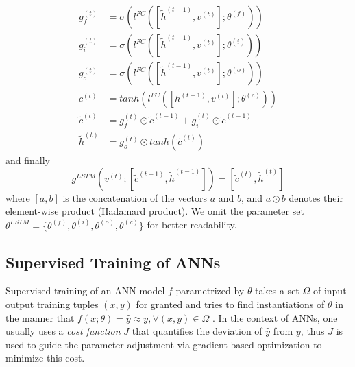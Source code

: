 \begin{equation} \label{eq:lstm_interm}
\begin{split}
g_f^{(t)} & = \sigma(l^{FC}([\tilde{h}^{(t-1)}, v^{(t)}]; \theta^{(f)})) \\
g_i^{(t)} & = \sigma(l^{FC}([\tilde{h}^{(t-1)}, v^{(t)}]; \theta^{(i)})) \\
g_o^{(t)} & = \sigma(l^{FC}([\tilde{h}^{(t-1)}, v^{(t)}]; \theta^{(o)})) \\
c^{(t)} & = tanh(l^{FC}([h^{(t-1)}, v^{(t)}]; \theta^{(c)})) \\
\tilde{c}^{(t)} & = g_f^{(t)} \odot \tilde{c}^{(t-1)} + g_i^{(t)} \odot \tilde{c}^{(t-1)} \\
\tilde{h}^{(t)} & = g_o^{(t)} \odot tanh(\tilde{c}^{(t)})
\end{split}
\end{equation}
and finally
\begin{equation} \label{eq:lstm}
g^{LSTM}(v^{(t)};[\tilde{c}^{(t-1)}, \tilde{h}^{(t-1)}]) = [\tilde{c}^{(t)}, \tilde{h}^{(t)}]
\end{equation}
where $[a, b]$ is the concatenation of the vectors $a$ and $b$, and $a \odot b$ denotes their element-wise  product (Hadamard product). We omit the parameter set $\theta^{LSTM} = \{\theta^{(f)}, \theta^{(i)}, \theta^{(o)}, \theta^{(c)}\}$ for better readability.

\subsection{Supervised Training of ANNs}
Supervised training of an \ac{ANN} model $f$ parametrized by $\theta$ takes a set $\Omega$ of input-output training tuples $(x,y)$ for granted and tries to find instantiations of $\theta$ in the manner that $f(x;\theta) = \hat{y} \approx y, \forall (x,y) \in \Omega$ \autocite{mohri_foundations_2012}. In the context of \ac{ANN}s, one usually uses a \textit{cost function} $J$ that quantifies the deviation of $\hat{y}$ from $y$, thus $J$ is used to guide the parameter adjustment via gradient-based optimization to minimize this cost.%

